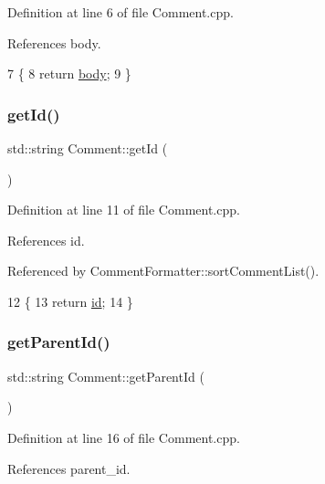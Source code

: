 Definition at line 6 of file Comment.\+cpp.



References body.


\begin{DoxyCode}
7 \{
8     \textcolor{keywordflow}{return} \hyperlink{class_comment_af8df10ee9d38440d5c4d500ccc9f2519}{body};
9 \}
\end{DoxyCode}
\mbox{\label{class_comment_ab46d905afeb79abd5caa6434c84020d8}} 
\subsubsection{\texorpdfstring{get\+Id()}{getId()}}
{\footnotesize\ttfamily std\+::string Comment\+::get\+Id (\begin{DoxyParamCaption}{ }\end{DoxyParamCaption})}



Definition at line 11 of file Comment.\+cpp.



References id.



Referenced by Comment\+Formatter\+::sort\+Comment\+List().


\begin{DoxyCode}
12 \{
13     \textcolor{keywordflow}{return} \hyperlink{class_comment_a63db6067036146247c4ab7f663d90369}{id};
14 \}
\end{DoxyCode}
\mbox{\label{class_comment_a2903eea46f56ee796715e4989d1745f1}} 
\subsubsection{\texorpdfstring{get\+Parent\+Id()}{getParentId()}}
{\footnotesize\ttfamily std\+::string Comment\+::get\+Parent\+Id (\begin{DoxyParamCaption}{ }\end{DoxyParamCaption})}



Definition at line 16 of file Comment.\+cpp.



References parent\+\_\+id.


